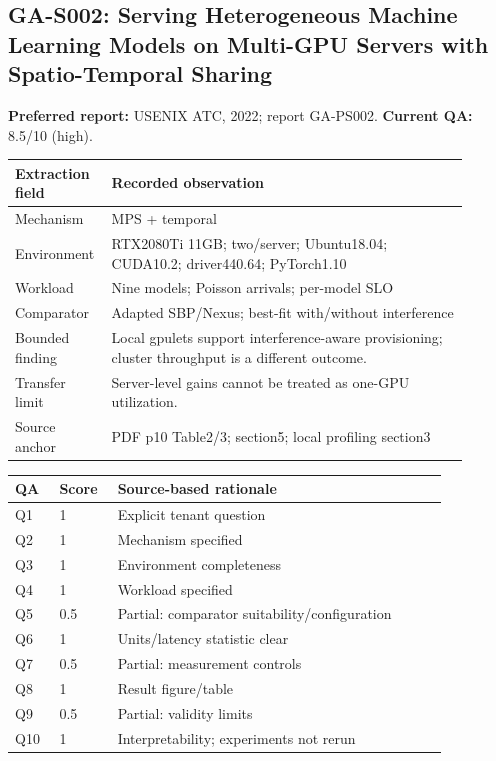 \subsection{GA-S002: Serving Heterogeneous Machine Learning Models on Multi-GPU Servers with Spatio-Temporal Sharing}
\textbf{Preferred report:} USENIX ATC, 2022; report GA-PS002. \textbf{Current QA:} 8.5/10 (high).
\begin{longtable}{P{0.15\linewidth}P{0.75\linewidth}}
\toprule Extraction field & Recorded observation\\\midrule\endhead
Mechanism & MPS + temporal\\
Environment & RTX2080Ti 11GB; two/server; Ubuntu18.04; CUDA10.2; driver440.64; PyTorch1.10\\
Workload & Nine models; Poisson arrivals; per-model SLO\\
Comparator & Adapted SBP/Nexus; best-fit with/without interference\\
Bounded finding & Local gpulets support interference-aware provisioning; cluster throughput is a different outcome.\\
Transfer limit & Server-level gains cannot be treated as one-GPU utilization.\\
Source anchor & PDF p10 Table2/3; section5; local profiling section3\\
\bottomrule\end{longtable}
\begin{longtable}{P{0.09\linewidth}P{0.10\linewidth}P{0.67\linewidth}}
\toprule QA & Score & Source-based rationale\\\midrule\endhead
Q1 & 1 & Explicit tenant question\\
Q2 & 1 & Mechanism specified\\
Q3 & 1 & Environment completeness\\
Q4 & 1 & Workload specified\\
Q5 & 0.5 & Partial: comparator suitability/configuration\\
Q6 & 1 & Units/latency statistic clear\\
Q7 & 0.5 & Partial: measurement controls\\
Q8 & 1 & Result figure/table\\
Q9 & 0.5 & Partial: validity limits\\
Q10 & 1 & Interpretability; experiments not rerun\\
\bottomrule\end{longtable}

